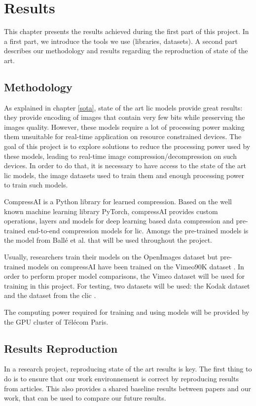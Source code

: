 \chapter{Results}
\label{results}
This chapter presents the results achieved during the first part of this project. In a first part, we introduce the tools we use (libraries, datasets). A second part describes our methodology and results regarding the reproduction of state of the art.

\section{Methodology}
As explained in chapter \ref{sota}, state of the art \acrshort{lic} models provide great results: they provide encoding of images that contain very few bits while preserving the images quality. However, these models require a lot of processing power making them unsuitable for real-time application on resource constrained devices. The goal of this project is to explore solutions to reduce the processing power used by these models, leading to real-time image compression/decompression on such devices. In order to do that, it is necessary to have access to the state of the art \acrshort{lic} models, the image datasets used to train them and enough processing power to train such models.

CompressAI \cite{compressai} is a Python library for learned compression. Based on the well known machine learning library PyTorch, compressAI provides custom operations, layers and models for deep learning based data compression and pre-trained end-to-end compression models for \acrshort{lic}. Amongs the pre-trained models is the model from Ballé et al.\cite{ballemshj18} that will be used throughout the project.

Usually, researchers train their models on the OpenImages dataset \cite{openimages} but pre-trained models on compressAI have been trained on the Vimeo90K dataset \cite{xue2019video}. In order to perform proper model comparisons, the Vimeo dataset will be used for training in this project. For testing, two datasets will be used: the Kodak dataset \cite{kodak} and the dataset from the \acrfull{clic} \cite{clic}.

The computing power required for training and using models will be provided by the GPU cluster of Télécom Paris.

\section{Results Reproduction}
In a research project, reproducing state of the art results is key. The first thing to do is to ensure that our work environnement is correct by reproducing results from articles. This also provides a shared baseline results between papers and our work, that can be used to compare our future results.

